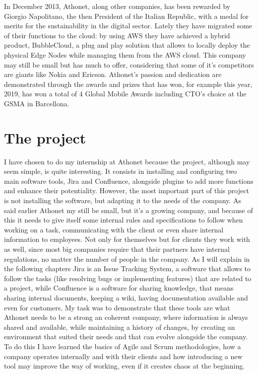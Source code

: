	In December 2013, Athonet, along other companies, has been rewarded by Giorgio Napolitano, the then President of the Italian Republic, with a medal for merits for the sustainability in the digital sector.
	Lately they have migrated some of their functions to the cloud: by using AWS they have achieved a hybrid product, BubbleCloud, a plug and play solution that allows to locally deploy the physical Edge Nodes while managing them from the AWS cloud.
	This company may still be small but has much to offer, considering that some of it's competitors are giants like Nokia and Ericson.
	Athonet's passion and dedication are demonstrated through the awards and prizes that has won, for example this year, 2019, has won a total of 4 Global Mobile Awards including CTO’s choice at the GSMA in Barcellona.

\section{The project}

	I have chosen to do my internship at Athonet because the project, although may seem simple, is quite interesting.
	It consists in installing and configuring two main software tools, Jira and Confluence, alongside plugins to add more functions and enhance their potentiality.
	However, the most important part of this project is not installing the software, but adapting it to the needs of the company.
	As said earlier Athonet my still be small, but it's a growing company, and because of this it needs to give itself some internal rules and specifications to follow when working on a task, communicating with the client or even share internal information to employees.
	Not only for themselves but for clients they work with as well, since most big companies require that their partners have internal regulations, no matter the number of people in the company.
	As I will explain in the following chapters Jira is an Issue Tracking System, a software that allows to follow the tasks (like resolving bugs or implementing features) that are related to a project, while Confluence is a software for sharing knowledge, that means sharing internal documents, keeping a wiki, having documentation available and even for customers.
	My task was to demonstrate that these tools are what Athonet needs to be a strong an coherent company, where information is always shared and available, while maintaining a history of changes, by creating an environment that suited their needs and that can evolve alongside the company.
	To do this I have learned the basics of Agile and Scrum methodologies, how a company operates internally and with their clients and how introducing a new tool may improve the way of working, even if it creates chaos at the beginning.

